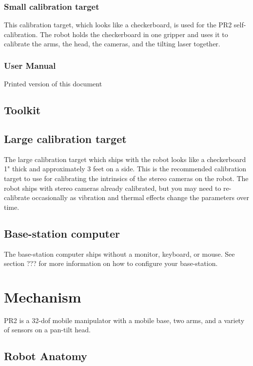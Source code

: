 \subsubsection{Small calibration target}
This calibration target, which looks like a checkerboard, is used for the PR2 self-calibration.  The robot holds the checkerboard in one gripper and uses it to calibrate the arms, the head, the cameras, and the tilting laser together.

\subsubsection{User Manual}
Printed version of this document

\subsection{Toolkit}


\subsection{Large calibration target}
The large calibration target which ships with the robot looks like a checkerboard 1" thick and approximately 3 feet on a side.  This is the recommended calibration target to use for calibrating the intrinsics of the stereo cameras on the robot.  The robot ships with stereo cameras already calibrated, but you may need to re-calibrate occasionally as vibration and thermal effects change the parameters over time.

\subsection{Base-station computer}
The base-station computer ships without a monitor, keyboard, or mouse.  See section ??? for more information on how to configure your base-station.

\section{Mechanism}
PR2 is a 32-dof mobile manipulator with a mobile base, two arms, and a variety of sensors on a pan-tilt head.

\subsection{Robot Anatomy}

